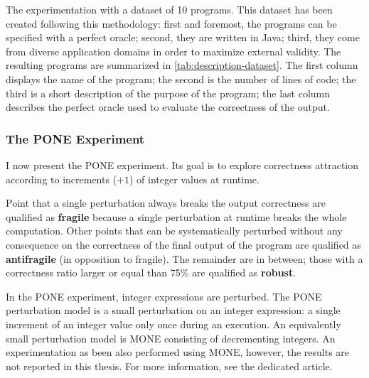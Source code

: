 The experimentation with a dataset of 10 programs. 
This dataset has been created following this methodology:
first and foremost, the programs can be specified with a perfect oracle;
second, they are written in Java;
third, they come from diverse application domains in order to maximize external validity.
The resulting programs are summarized in \autoref{tab:description-dataset}. 
The first column displays the name of the program; 
the second is the number of lines of code; 
the third is a short description of the purpose of the program; 
the last column describes the perfect oracle used to evaluate the correctness of the output.

\subsubsection{The PONE Experiment}
\label{subsubsec:transversal-contributions:correctness:experimentation:PONE}

I now present the PONE experiment. 
Its goal is to explore correctness attraction according to increments ($+ 1$) of integer values at runtime.

Point that a single perturbation always breaks the output correctness are qualified as \textbf{fragile} because a single perturbation at runtime breaks the whole computation.
Other points that can be systematically perturbed without any consequence on the correctness of the final output of the program are qualified as \textbf{antifragile} (in opposition to fragile).
The remainder are in between; those with a correctness ratio larger or equal than 75\% are qualified as \textbf{robust}.

In the PONE experiment, integer expressions are perturbed.
The PONE perturbation model is a small perturbation on an integer expression: a single increment of an integer value only once during an execution. 
An equivalently small perturbation model is MONE consisting of decrementing integers. 
An experimentation as been also performed using MONE, however, the results are not reported in this thesis.
For more information, see the dedicated article.\cite{Danglot2018}

